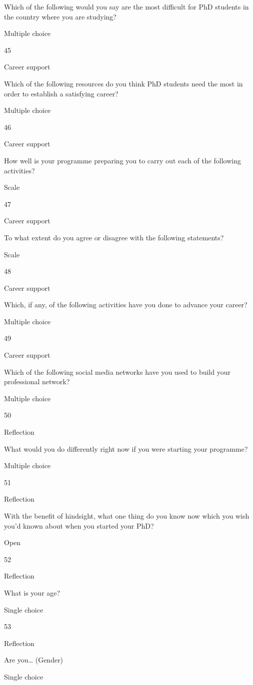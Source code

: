 \documentclass[
]{article}
\begin{document}
Which of the following would you say are the most difficult for PhD
students in the country where you are studying?

Multiple choice

45

Career support

Which of the following resources do you think PhD students need the most
in order to establish a satisfying career?

Multiple choice

46

Career support

How well is your programme preparing you to carry out each of the
following activities?

Scale

47

Career support

To what extent do you agree or disagree with the following statements?

Scale

48

Career support

Which, if any, of the following activities have you done to advance your
career?

Multiple choice

49

Career support

Which of the following social media networks have you used to build your
professional network?

Multiple choice

50

Reflection

What would you do differently right now if you were starting your
programme?

Multiple choice

51

Reflection

With the benefit of hindsight, what one thing do you know now which you
wish you'd known about when you started your PhD?

Open

52

Reflection

What is your age?

Single choice

53

Reflection

Are you\ldots{} (Gender)

Single choice
\end{document}
